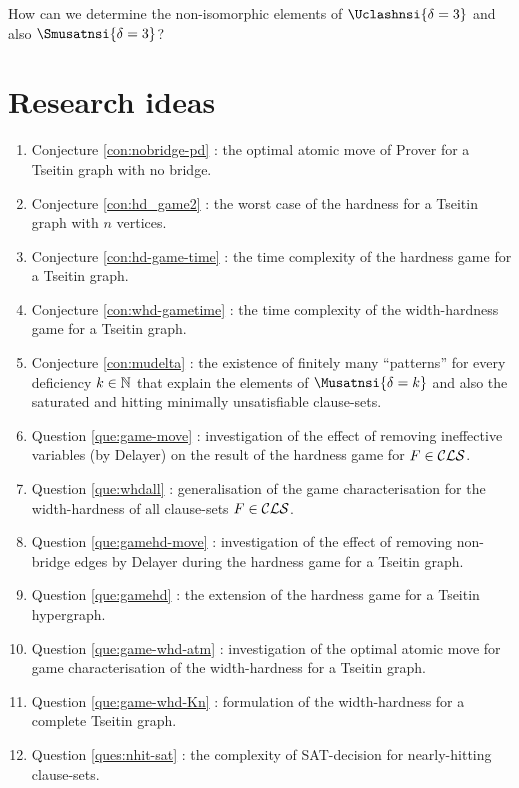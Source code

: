 \documentclass{report}
\begin{document}
\begin{quest}\label{que:smu-3}
How can we determine the non-isomorphic elements of $\Uclashnsi{\delta=3}$ and also $\Smusatnsi{\delta=3}$?
\end{quest}
\chapter{Research ideas}
\label{cha:concl}

  \begin{enumerate}
  \item Conjecture \ref{con:nobridge-pd} : the optimal atomic move of Prover for a Tseitin graph with no bridge.
  \item Conjecture \ref{con:hd_game2} : the worst case of the hardness for a Tseitin graph with $n$ vertices.
  \item Conjecture \ref{con:hd-game-time} : the time complexity of the hardness game for a Tseitin graph. 
  \item Conjecture \ref{con:whd-gametime} : the time complexity of the width-hardness game for a Tseitin graph.
  \item Conjecture \ref{con:mudelta} : the existence of finitely many ``patterns'' for every deficiency $k \in \mathbb{N}$ that explain the elements of $\Musatnsi{\delta=k}$ and also the saturated and hitting minimally unsatisfiable clause-sets. 
  \item Question \ref{que:game-move} : investigation of the effect of removing ineffective variables (by Delayer) on the result of the hardness game for $F \in \mathcal{CLS}$.
  \item Question \ref{que:whdall} : generalisation of the game characterisation for the width-hardness of all clause-sets $F \in \mathcal{CLS}$.
  \item Question \ref{que:gamehd-move} : investigation of the effect of removing non-bridge edges by Delayer during the hardness game for a Tseitin graph.
  \item Question \ref{que:gamehd} : the extension of the hardness game for a Tseitin hypergraph.
  \item Question \ref{que:game-whd-atm} : investigation of the optimal atomic move for game characterisation of the width-hardness for a Tseitin graph.
  \item Question \ref{que:game-whd-Kn} : formulation of the width-hardness for a complete Tseitin graph.
  \item Question \ref{ques:nhit-sat} : the complexity of SAT-decision for nearly-hitting clause-sets.

\end{enumerate}
\end{document}
